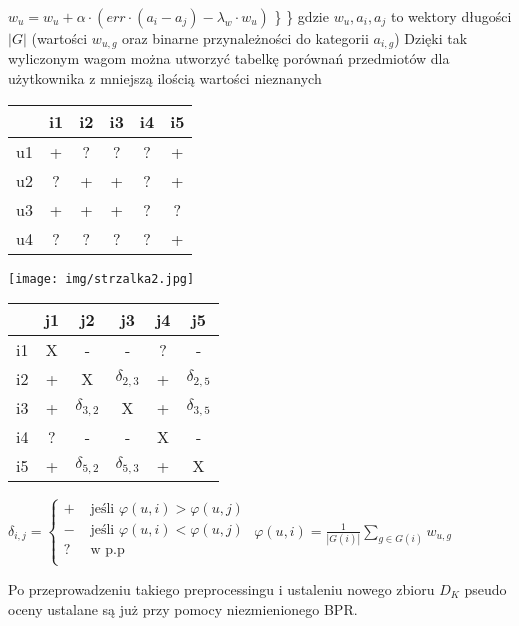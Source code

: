 \documentclass{pracamgr}
\begin{document}
     \hspace*{32pt}		$w_u=w_u+\alpha\cdot(err\cdot (a_i-a_j)-\lambda_w\cdot w_u)$\newline
     \hspace*{16pt}	\}\newline
     \hspace*{0pt}\}\newline
     {\scriptsize
      gdzie $w_u,a_i,a_j$ to wektory długości $|G|$ (wartości $w_{u,g}$ oraz binarne przynależności do kategorii $a_{i,g}$)
     }\newline
     Dzięki tak wyliczonym wagom można utworzyć tabelkę porównań przedmiotów dla użytkownika z mniejszą ilością wartości nieznanych\newline
     \begin{multicols}{3}
      \begin{tabular}{c|c|c|c|c|c|}
        & i1 & i2 & i3 & i4 & i5 \\
       \hline
       u1 & + & ? & ? & ? & + \\
       \hline
       u2 & ? & + & + & ? & + \\    
       \hline
       u3 & + & + & + & ? & ? \\
       \hline
       u4 & ? & ? & ? & ? & + \\    
      \end{tabular}
      \begin{center}
       \texttt{[image: img/strzalka2.jpg]}\newline
      \end{center}
      \begin{tabular}{c|c|c|c|c|c|}
          & j1 & j2 & 		j3 & 		j4 & j5 \\
       \hline
       i1 & X &	- &	 	 - &		 ? & - \\
       \hline
       i2 & + &	X &	 	 $\delta_{2,3}$ & + & $\delta_{2,5}$ \\    
       \hline
       i3 & + &	$\delta_{3,2}$ & X &		 + & $\delta_{3,5}$ \\    
       \hline
       i4 & ? &	- &	 	 - &		 X & - \\
       \hline
       i5 & + &	$\delta_{5,2}$ & $\delta_{5,3}$ & + & X \\ 
      \end{tabular}
     \end{multicols}
     \begin{center}
      $\delta_{i,j}=\left\{\begin{array}{cc}
       + &\text{ jeśli } \varphi(u,i)>\varphi(u,j)\\
       - &\text{ jeśli } \varphi(u,i)<\varphi(u,j)\\
       ? &\text{ w p.p }\\
      \end{array}\right.$\quad\quad\quad\quad\quad\quad\quad
      $\varphi(u,i)=\frac{1}{|G(i)|}\sum\limits_{g\in G(i)}w_{u,g}$
     \end{center}
     Po przeprowadzeniu takiego preprocessingu i ustaleniu nowego zbioru $D_K$ pseudo oceny ustalane są już przy pomocy niezmienionego BPR.
\end{document}
